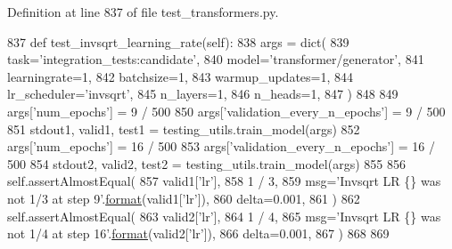 Definition at line 837 of file test\+\_\+transformers.\+py.


\begin{DoxyCode}
837     \textcolor{keyword}{def }test\_invsqrt\_learning\_rate(self):
838         args = dict(
839             task=\textcolor{stringliteral}{'integration\_tests:candidate'},
840             model=\textcolor{stringliteral}{'transformer/generator'},
841             learningrate=1,
842             batchsize=1,
843             warmup\_updates=1,
844             lr\_scheduler=\textcolor{stringliteral}{'invsqrt'},
845             n\_layers=1,
846             n\_heads=1,
847         )
848 
849         args[\textcolor{stringliteral}{'num\_epochs'}] = 9 / 500
850         args[\textcolor{stringliteral}{'validation\_every\_n\_epochs'}] = 9 / 500
851         stdout1, valid1, test1 = testing\_utils.train\_model(args)
852         args[\textcolor{stringliteral}{'num\_epochs'}] = 16 / 500
853         args[\textcolor{stringliteral}{'validation\_every\_n\_epochs'}] = 16 / 500
854         stdout2, valid2, test2 = testing\_utils.train\_model(args)
855 
856         self.assertAlmostEqual(
857             valid1[\textcolor{stringliteral}{'lr'}],
858             1 / 3,
859             msg=\textcolor{stringliteral}{'Invsqrt LR \{\} was not 1/3 at step 9'}.\hyperlink{namespaceparlai_1_1chat__service_1_1services_1_1messenger_1_1shared__utils_a32e2e2022b824fbaf80c747160b52a76}{format}(valid1[\textcolor{stringliteral}{'lr'}]),
860             delta=0.001,
861         )
862         self.assertAlmostEqual(
863             valid2[\textcolor{stringliteral}{'lr'}],
864             1 / 4,
865             msg=\textcolor{stringliteral}{'Invsqrt LR \{\} was not 1/4 at step 16'}.\hyperlink{namespaceparlai_1_1chat__service_1_1services_1_1messenger_1_1shared__utils_a32e2e2022b824fbaf80c747160b52a76}{format}(valid2[\textcolor{stringliteral}{'lr'}]),
866             delta=0.001,
867         )
868 
869 
\end{DoxyCode}
\mbox{\label{classtests_1_1test__transformers_1_1TestLearningRateScheduler_a8c89a354321034bd5717b8e1907cbfeb}} 

